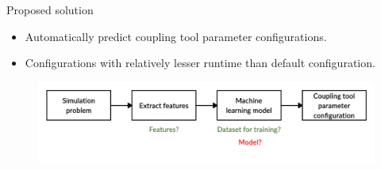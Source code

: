 \documentclass[10pt]{beamer}
\begin{document}


\begin{frame}[t]{Proposed solution}

\begin{itemize}
    \item Automatically predict coupling tool parameter configurations.
    \newline
    \item Configurations with relatively lesser runtime than default configuration.
\end{itemize} 
\begin{figure}[h!]
\centering
\includegraphics[trim={0 3cm 0 0},width=\linewidth]{images/proposedstrategy_challenge3a.jpg}
\label{fig:simplegoal_challenge3}
\end{figure}  
    
\end{frame}
\end{document}

